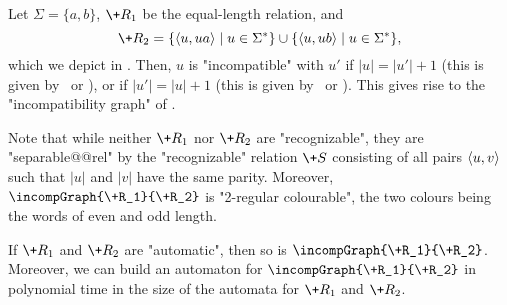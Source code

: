 \begin{example}%
    \AP\label{ex:equal-length-plusone}%
    Let $\Sigma = \{a,b\}$, $\+R_1$ be the equal-length relation,
    and
    \[
        \+R_2 = \{\tup{u, ua} \mid u \in \Sigma^*\} \cup \{\tup{u, ub} \mid u \in \Sigma^*\},
    \]
    which we depict in .
    Then, $u$ is "incompatible" with $u'$ if $|u| = |u'|+1$ (this is given by \compL~or \compR),
    or if $|u'| = |u|+1$ (this is given by \compLpr~or \compRpr).
    This gives rise to the "incompatibility graph" of
    .
    \begin{marginfigure}[-8em]%
        \centering
        \begin{tikzpicture}
            
        \end{tikzpicture}
        \caption{\AP\label{fig:equal-length-plusone-relation}%
            The relation $\+R_2$ of ,
            restricted to words of length at most 2.
        }
    \end{marginfigure}%
    \begin{marginfigure}%
        \centering
        \begin{tikzpicture}
            
        \end{tikzpicture}
        \caption{\AP\label{fig:equal-length-plusone-incompatibility}%
            "Incompatibility graph" $\incompGraph{\+R_1}{\+R_2}$ and its "2-regular colouring".%
        }
    \end{marginfigure}%

    Note that while neither $\+R_1$ nor $\+R_2$ are "recognizable",
    they are "separable@@rel" by the "recognizable" relation
    $\+S$ consisting of all pairs $\tup{u,v}$ such that $|u|$ and $|v|$ have the same parity.
    Moreover, $\incompGraph{\+R_1}{\+R_2}$ is "2-regular colourable", the two colours being
    the words of even and odd length.
\end{example}

\begin{proposition}
    \AP\label{prop:incomp-is-automatic}
    If $\+R_1$ and $\+R_2$ are "automatic", then so is $\incompGraph{\+R_1}{\+R_2}$.
    Moreover, we can build an automaton for $\incompGraph{\+R_1}{\+R_2}$ in polynomial time in the size of the automata for $\+R_1$ and $\+R_2$.
\end{proposition}

